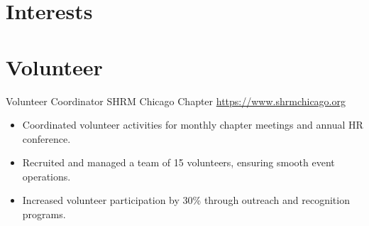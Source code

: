 \documentclass[a4paper, serif, 10pt]{moderncv}
\begin{document}
\section{Interests}

\section{Volunteer}

        {Volunteer Coordinator}
        {SHRM Chicago Chapter}
        {\url{https://www.shrmchicago.org}}
        {}
        {\begin{itemize}
\item Coordinated volunteer activities for monthly chapter meetings and annual HR conference.
\item Recruited and managed a team of 15 volunteers, ensuring smooth event operations.
\item Increased volunteer participation by 30\% through outreach and recognition programs.
\end{itemize}}
    
\end{document}
